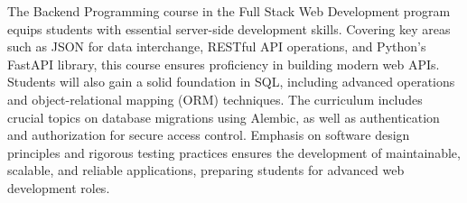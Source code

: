 The Backend Programming course in the Full Stack Web Development program equips students with essential server-side development skills.
Covering key areas such as JSON for data interchange, RESTful API operations, and Python's FastAPI library, this course ensures proficiency in building modern web APIs.
Students will also gain a solid foundation in SQL, including advanced operations and object-relational mapping (ORM) techniques.
The curriculum includes crucial topics on database migrations using Alembic, as well as authentication and authorization for secure access control.
Emphasis on software design principles and rigorous testing practices ensures the development of maintainable, scalable, and reliable applications, preparing students for advanced web development roles.
